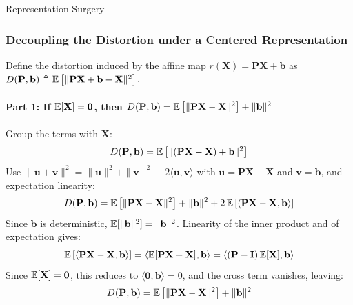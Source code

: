 \begin{question}{Representation Surgery}
\begin{subquestion}
\end{subquestion}

\begin{subquestion}

\subsubsection*{Decoupling the Distortion under a Centered Representation}

Define the distortion induced by the affine map $r(\mathbf{X}) = \mathbf{P}\mathbf{X} + \mathbf{b}$ as $D(\mathbf{P}, \mathbf{b}) \triangleq \expectation\left[\|\mathbf{P}\mathbf{X} + \mathbf{b} - \mathbf{X}\|^2\right]$.

\paragraph{Part 1: If $\expectation[\mathbf{X}] = \mathbf{0}$, then $D(\mathbf{P}, \mathbf{b}) = \expectation\left[\|\mathbf{P}\mathbf{X} - \mathbf{X}\|^2\right] + \|\mathbf{b}\|^2$}

Group the terms with $\mathbf{X}$:
\begin{equation}
    D(\mathbf{P}, \mathbf{b}) = \expectation\left[\|(\mathbf{P}\mathbf{X} - \mathbf{X}) + \mathbf{b}\|^2\right]
\end{equation}
Use $\|\mathbf{u} + \mathbf{v}\|^2 = \|\mathbf{u}\|^2 + \|\mathbf{v}\|^2 + 2\langle \mathbf{u}, \mathbf{v}\rangle$ with $\mathbf{u} = \mathbf{P}\mathbf{X} - \mathbf{X}$ and $\mathbf{v} = \mathbf{b}$, and expectation linearity:
\begin{equation}
    D(\mathbf{P}, \mathbf{b}) = \expectation\left[\|\mathbf{P}\mathbf{X} - \mathbf{X}\|^2\right] + \|\mathbf{b}\|^2 + 2\, \expectation\left[\langle \mathbf{P}\mathbf{X} - \mathbf{X}, \mathbf{b}\rangle\right]
\end{equation}
Since $\mathbf{b}$ is deterministic, $\expectation[\|\mathbf{b}\|^2] = \|\mathbf{b}\|^2$. 
Linearity of the inner product and of expectation gives:
\begin{equation}
    \expectation\left[\langle \mathbf{P}\mathbf{X} - \mathbf{X}, \mathbf{b}\rangle\right] = \langle \expectation[\mathbf{P}\mathbf{X} - \mathbf{X}], \mathbf{b}\rangle = \langle (\mathbf{P} - \mathbf{I})\, \expectation[\mathbf{X}], \mathbf{b}\rangle
\end{equation}
Since $\expectation[\mathbf{X}] = \mathbf{0}$, this reduces to $\langle \mathbf{0}, \mathbf{b}\rangle = 0$, and the cross term vanishes, leaving:
\begin{equation}
    D(\mathbf{P}, \mathbf{b}) = \expectation\left[\|\mathbf{P}\mathbf{X} - \mathbf{X}\|^2\right] + \|\mathbf{b}\|^2
\end{equation}


\end{subquestion}
\end{question}
